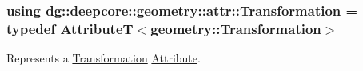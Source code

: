 \subsubsection[{\texorpdfstring{Transformation}{Transformation}}]{\setlength{\rightskip}{0pt plus 5cm}using {\bf dg\+::deepcore\+::geometry\+::attr\+::\+Transformation} = typedef AttributeT$<$geometry\+::\+Transformation$>$}\hypertarget{group___geometry_attributes_ga0ff2f8043ad91558a37326d1ee3e4331}{}\label{group___geometry_attributes_ga0ff2f8043ad91558a37326d1ee3e4331}


Represents a \hyperlink{structdg_1_1deepcore_1_1geometry_1_1_transformation}{Transformation} \hyperlink{classdg_1_1deepcore_1_1_attribute}{Attribute}. 

